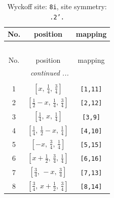 \documentclass[fleqn,8pt]{jsarticle}
\begin{document}
\renewcommand{\arraystretch}{1.2}
\begin{longtable}{ccc}
\caption{Wyckoff site: {\tt 8i}, site symmetry: {\tt .2'.}}
 \\
 \hline \hline
No. & position & mapping \\ \hline \endfirsthead

\multicolumn{2}{l}{\tablename\ \thetable{}} \\
 \hline \hline
No. & position & mapping \\ \hline \endhead

 \hline \hline
\multicolumn{2}{r}{\footnotesize\it continued ...} \\ \endfoot

 \hline \hline
\multicolumn{2}{r}{} \\ \endlastfoot

1 & $\left[ x,\, \frac{1}{4},\, \frac{3}{4} \right]$ & {\tt [1,11]} \\ \hline
2 & $\left[ \frac{1}{2} - x,\, \frac{1}{4},\, \frac{3}{4} \right]$ & {\tt [2,12]} \\ \hline
3 & $\left[ \frac{1}{4},\, x,\, \frac{1}{4} \right]$ & {\tt [3,9]} \\ \hline
4 & $\left[ \frac{1}{4},\, \frac{1}{2} - x,\, \frac{1}{4} \right]$ & {\tt [4,10]} \\ \hline
5 & $\left[ - x,\, \frac{3}{4},\, \frac{1}{4} \right]$ & {\tt [5,15]} \\ \hline
6 & $\left[ x + \frac{1}{2},\, \frac{3}{4},\, \frac{1}{4} \right]$ & {\tt [6,16]} \\ \hline
7 & $\left[ \frac{3}{4},\, - x,\, \frac{3}{4} \right]$ & {\tt [7,13]} \\ \hline
8 & $\left[ \frac{3}{4},\, x + \frac{1}{2},\, \frac{3}{4} \right]$ & {\tt [8,14]} \\
\end{longtable}
\renewcommand{\arraystretch}{1.2}
\end{document}
